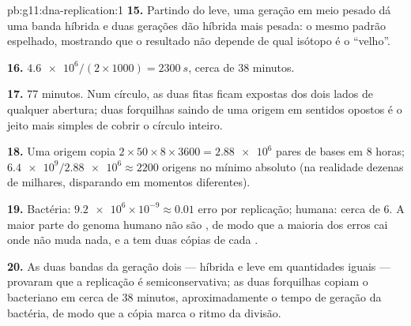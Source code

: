 \begin{solution}{pb:g11:dna-replication:1}
\textbf{15.} Partindo do leve, uma geração em meio pesado dá uma banda
híbrida e duas gerações dão híbrida mais pesada: o mesmo padrão
espelhado, mostrando que o resultado não depende de qual isótopo é o
``velho''.

\textbf{16.} $\num{4.6e6}/(2 \times 1000) = \qty{2300}{s}$, cerca de
38 minutos.

\textbf{17.} 77 minutos. Num círculo, as duas fitas ficam expostas dos
dois lados de qualquer abertura; duas forquilhas saindo de uma origem
em sentidos opostos é o jeito mais simples de cobrir o círculo inteiro.

\textbf{18.} Uma origem copia $2 \times 50 \times 8 \times 3600 =
\num{2.88e6}$ pares de bases em 8 horas; $\num{6.4e9}/\num{2.88e6}
\approx 2200$ origens no mínimo absoluto (na realidade dezenas de
milhares, disparando em momentos diferentes).

\textbf{19.} Bactéria: $\num{9.2e6} \times 10^{-9} \approx 0.01$ erro
por replicação;  humana: cerca de 6. A maior parte do genoma
humano não são , de modo que a maioria dos erros cai onde não muda
nada, e a  tem duas cópias de cada .

\textbf{20.} As duas bandas da geração dois --- híbrida e leve em
quantidades iguais --- provaram que a replicação é semiconservativa; as
duas forquilhas copiam o  bacteriano em cerca de 38 minutos,
aproximadamente o tempo de geração da bactéria, de modo que a cópia
marca o ritmo da divisão.
\end{solution}
